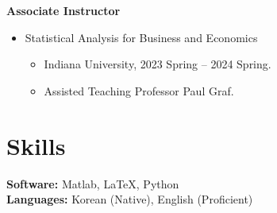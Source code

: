 \documentclass[11pt,a4paper]{article}
\begin{document}
\textbf{Associate Instructor}
\begin{itemize}[leftmargin=*]   
    \item Statistical Analysis for Business and Economics
    \begin{itemize}[leftmargin=*]
        \item Indiana University, 2023 Spring -- 2024 Spring.
        \item Assisted Teaching Professor Paul Graf.
    \end{itemize}
\end{itemize}



\section*{Skills}
\textbf{Software:} Matlab, LaTeX, Python \\
\textbf{Languages:} Korean (Native), English (Proficient)
\end{document}
